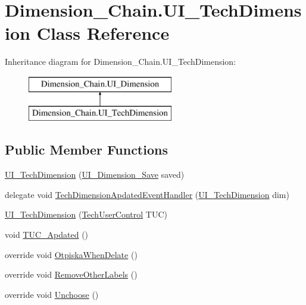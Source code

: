 \hypertarget{class_dimension___chain_1_1_u_i___tech_dimension}{}\section{Dimension\+\_\+\+Chain.\+U\+I\+\_\+\+Tech\+Dimension Class Reference}
\label{class_dimension___chain_1_1_u_i___tech_dimension}
Inheritance diagram for Dimension\+\_\+\+Chain.\+U\+I\+\_\+\+Tech\+Dimension\+:\begin{figure}[H]
\begin{center}
\leavevmode
\includegraphics[height=2.000000cm]{class_dimension___chain_1_1_u_i___tech_dimension}
\end{center}
\end{figure}
\subsection*{Public Member Functions}
\begin{DoxyCompactItemize}
\item 
\mbox{\hyperlink{class_dimension___chain_1_1_u_i___tech_dimension_a8075dce6b26f265a61725c27a636aa38}{U\+I\+\_\+\+Tech\+Dimension}} (\mbox{\hyperlink{class_dimension___chain_1_1_u_i___dimension___save}{U\+I\+\_\+\+Dimension\+\_\+\+Save}} saved)
\item 
delegate void \mbox{\hyperlink{class_dimension___chain_1_1_u_i___tech_dimension_a55a3d4e5dad3a8b18f8bffb9adf5cb6f}{Tech\+Dimension\+Apdated\+Event\+Handler}} (\mbox{\hyperlink{class_dimension___chain_1_1_u_i___tech_dimension}{U\+I\+\_\+\+Tech\+Dimension}} dim)
\item 
\mbox{\hyperlink{class_dimension___chain_1_1_u_i___tech_dimension_a08e8bf66ff37909eb567ef9fddb0fb03}{U\+I\+\_\+\+Tech\+Dimension}} (\mbox{\hyperlink{class_dimension___chain_1_1_tech_user_control}{Tech\+User\+Control}} T\+UC)
\item 
void \mbox{\hyperlink{class_dimension___chain_1_1_u_i___tech_dimension_ade84015225ae3cd225d1db4e2c78b42c}{T\+U\+C\+\_\+\+Apdated}} ()
\item 
override void \mbox{\hyperlink{class_dimension___chain_1_1_u_i___tech_dimension_a4c37ac44bbc3b0fdf564e42961353a5f}{Otpiska\+When\+Delate}} ()
\item 
override void \mbox{\hyperlink{class_dimension___chain_1_1_u_i___tech_dimension_a7b8198570ba66a56ef0c78a8550916d2}{Remove\+Other\+Labels}} ()
\item 
override void \mbox{\hyperlink{class_dimension___chain_1_1_u_i___tech_dimension_a36fd2ba82028e120d68819acc5c50daf}{Unchoose}} ()
\end{DoxyCompactItemize}
